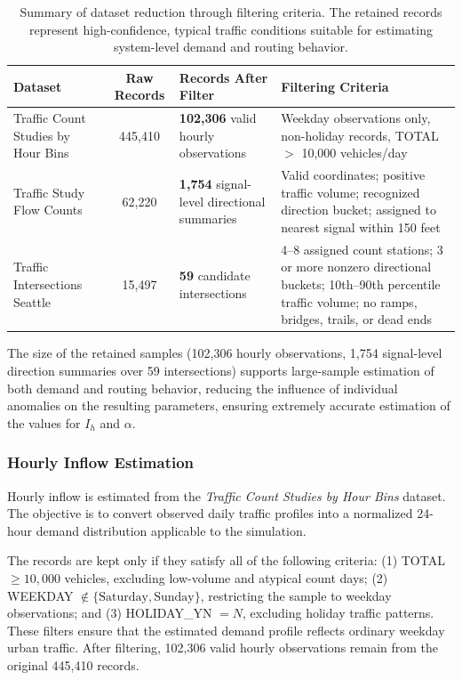 \documentclass[12pt]{article}
\begin{document}
\begin{table}[H]
\centering
\footnotesize
\setlength{\tabcolsep}{3pt}
\begin{tabularx}{\linewidth}{@{}XcXX@{}}
\toprule
\textbf{Dataset} & \textbf{Raw Records} & \textbf{Records After Filter} & \textbf{Filtering Criteria} \\
\midrule
Traffic Count Studies by Hour Bins & 445,410 &
\textbf{102,306} valid hourly observations &
Weekday observations only, non-holiday records, TOTAL $>$ 10,000 vehicles/day \\
Traffic Study Flow Counts & 62,220 &
\textbf{1,754} signal-level directional summaries &
Valid coordinates; positive traffic volume; recognized direction bucket; assigned to nearest signal within 150 feet \\
Traffic Intersections Seattle & 15,497 &
\textbf{59} candidate intersections &
4--8 assigned count stations; 3 or more nonzero directional buckets; 10th--90th percentile traffic volume; no ramps, bridges, trails, or dead ends \\
\bottomrule
\end{tabularx}
\caption{Summary of dataset reduction through filtering criteria. The retained records represent high-confidence, typical traffic conditions suitable for estimating system-level demand and routing behavior.}
\label{tab:filtering}
\end{table}


The size of the retained samples (102,306 hourly observations, 1,754 signal-level direction summaries over 59 intersections) supports large-sample estimation of both demand and routing behavior, reducing the influence of individual anomalies on the resulting parameters, ensuring extremely accurate estimation of the values for $I_{h}$ and $\alpha$.

\subsubsection{Hourly Inflow Estimation}

Hourly inflow is estimated from the \emph{Traffic Count Studies by Hour Bins} dataset. The objective is to convert observed daily traffic profiles into a normalized 24-hour demand distribution applicable to the simulation.

The records are kept only if they satisfy all of the following criteria: (1) TOTAL $\geq 10,000$ vehicles, excluding low-volume and atypical count days; (2) WEEKDAY $\notin \{\text{Saturday}, \text{Sunday}\}$, restricting the sample to weekday observations; and (3) HOLIDAY\_YN $= N$, excluding holiday traffic patterns. These filters ensure that the estimated demand profile reflects ordinary weekday urban traffic. After filtering, 102,306 valid hourly observations remain from the original 445,410 records.
\end{document}
